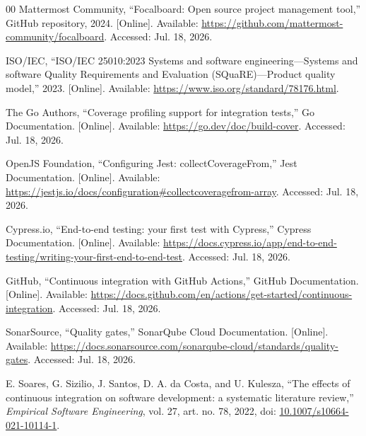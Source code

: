 \documentclass[conference]{IEEEtran}
\begin{document}
\begin{thebibliography}{00}
Mattermost Community, ``Focalboard: Open source project management tool,'' GitHub repository, 2024. [Online]. Available: \url{https://github.com/mattermost-community/focalboard}. Accessed: Jul. 18, 2026.

ISO/IEC, ``ISO/IEC 25010:2023 Systems and software engineering---Systems and software Quality Requirements and Evaluation (SQuaRE)---Product quality model,'' 2023. [Online]. Available: \url{https://www.iso.org/standard/78176.html}.

The Go Authors, ``Coverage profiling support for integration tests,'' Go Documentation. [Online]. Available: \url{https://go.dev/doc/build-cover}. Accessed: Jul. 18, 2026.

OpenJS Foundation, ``Configuring Jest: collectCoverageFrom,'' Jest Documentation. [Online]. Available: \url{https://jestjs.io/docs/configuration#collectcoveragefrom-array}. Accessed: Jul. 18, 2026.

Cypress.io, ``End-to-end testing: your first test with Cypress,'' Cypress Documentation. [Online]. Available: \url{https://docs.cypress.io/app/end-to-end-testing/writing-your-first-end-to-end-test}. Accessed: Jul. 18, 2026.

GitHub, ``Continuous integration with GitHub Actions,'' GitHub Documentation. [Online]. Available: \url{https://docs.github.com/en/actions/get-started/continuous-integration}. Accessed: Jul. 18, 2026.

SonarSource, ``Quality gates,'' SonarQube Cloud Documentation. [Online]. Available: \url{https://docs.sonarsource.com/sonarqube-cloud/standards/quality-gates}. Accessed: Jul. 18, 2026.

E. Soares, G. Sizilio, J. Santos, D. A. da Costa, and U. Kulesza, ``The effects of continuous integration on software development: a systematic literature review,'' \textit{Empirical Software Engineering}, vol. 27, art. no. 78, 2022, doi: \href{https://doi.org/10.1007/s10664-021-10114-1}{10.1007/s10664-021-10114-1}.
\end{thebibliography}
\end{document}
